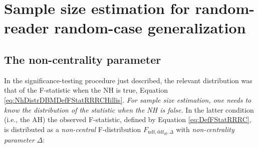 \documentclass[
]{book}
\newenvironment{Shaded}{\begin{snugshade}}{\end{snugshade}}
\newcommand{\CommentTok}[1]{\textcolor[rgb]{0.56,0.35,0.01}{\textit{#1}}}
\newcommand{\DecValTok}[1]{\textcolor[rgb]{0.00,0.00,0.81}{#1}}
\newcommand{\KeywordTok}[1]{\textcolor[rgb]{0.13,0.29,0.53}{\textbf{#1}}}
\newcommand{\NormalTok}[1]{#1}
\newcommand{\OperatorTok}[1]{\textcolor[rgb]{0.81,0.36,0.00}{\textbf{#1}}}
\newcommand{\StringTok}[1]{\textcolor[rgb]{0.31,0.60,0.02}{#1}}
\begin{document}
\begin{Shaded}
\end{Shaded}

\hypertarget{sample-size-estimation-for-random-reader-random-case-generalization}{%
\section{Sample size estimation for random-reader random-case generalization}\label{sample-size-estimation-for-random-reader-random-case-generalization}}

\hypertarget{the-non-centrality-parameter}{%
\subsection{The non-centrality parameter}\label{the-non-centrality-parameter}}

In the significance-testing procedure just described, the relevant distribution was that of the F-statistic when the NH is true, Equation \eqref{eq:NhDistrDBMDefFStatRRRCHillis}. \emph{For sample size estimation, one needs to know the distribution of the statistic when the NH is false.} In the latter condition (i.e., the AH) the observed F-statistic, defined by Equation \eqref{eq:DefFStatRRRC}, is distributed as a \emph{non-central} F-distribution \(F_{\text{ndf},{\text{ddf}}_H,\Delta}\) with \emph{non-centrality parameter} \(\Delta\):
\end{document}
